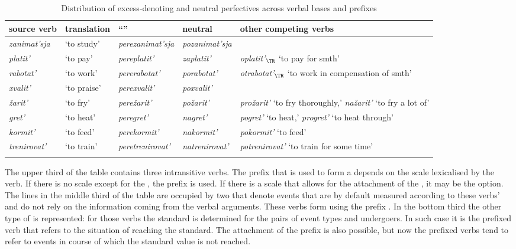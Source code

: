 \begin{sidewaystable}
\caption{Distribution of excess-denoting and neutral perfectives across verbal bases and prefixes \label{table:competition}}
\begin{tabularx}{\textwidth}{l  l  l  l  Q}
\lsptoprule
source verb& translation & ``'' & neutral & other competing verbs\\ \midrule
\textit{zanimat'sja} & `to study' & \textit{perezanimat'sja} & \textit{pozanimat'sja} & \\
\textit{platit'} & `to pay' & \textit{pereplatit'} & \textit{zaplatit'} & \textit{oplatit'$_{\TR}$} `to pay for smth'\\
\textit{rabotat'} & `to work' & \textit{pererabotat'} & \textit{porabotat'} & \textit{otrabotat'$_{\TR}$} `to work in compensation of smth'\\

\tablevspace
\textit{xvalit'} & `to praise' & \textit{perexvalit'} & \textit{poxvalit'} &\\
\textit{\v{z}arit'} & `to fry' & \textit{pere\v{z}arit'} & \textit{po\v{z}arit'} & \textit{pro\v{z}arit'} `to fry thoroughly,' \textit{na\v{z}arit'} `to fry a lot of'\\ 

\tablevspace
\textit{gret'} & `to heat' & \textit{peregret'} & \textit{nagret'} & \textit{pogret'} `to heat,' \textit{progret'} `to heat through'\\ 
\textit{kormit'} & `to feed' & \textit{perekormit'} & \textit{nakormit'} & \textit{pokormit'} `to feed'\\
\textit{trenirovat'} & `to train' & \textit{peretrenirovat'} & \textit{natrenirovat'} & \textit{potrenirovat'} `to train for some time'\\\lspbottomrule
\end{tabularx}
\end{sidewaystable}

The upper third of the table contains three intransitive verbs. The prefix that is used to form a  depends on the scale lexicalised by the verb. If there is no scale except for the , the prefix  is used. If there is a scale that allows for the attachment of the  , it may be the option. The lines in the middle third of the table are occupied by two  that denote events that are by default measured according to these verbs'   and do not rely on the information coming from the verbal arguments. These verbs form  using the prefix . In the bottom third the other type of  is represented: for those verbs the standard is determined for the pairs of event types and undergoers. In such case it is the prefixed verb that refers to the situation of reaching the standard. The attachment of the prefix  is also possible, but now the prefixed verbs tend to refer to events in course of which the standard value is not reached.

